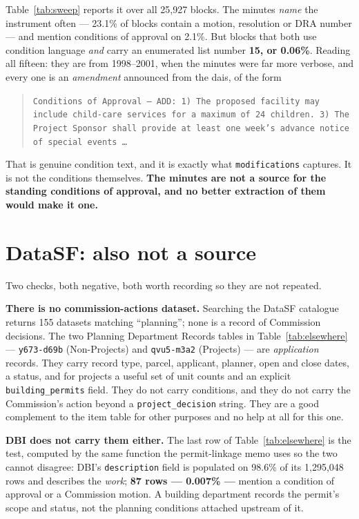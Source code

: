\documentclass[11pt]{article}
\begin{document}
Table~\ref{tab:sweep} reports it over all 25{,}927 blocks. The minutes \emph{name} the
instrument often --- 23.1\% of blocks contain a motion, resolution or DRA number --- and
mention conditions of approval on 2.1\%. But blocks that both use condition language
\emph{and} carry an enumerated list number \textbf{15, or 0.06\%}. Reading all fifteen: they
are from 1998--2001, when the minutes were far more verbose, and every one is an
\emph{amendment} announced from the dais, of the form

\begin{quote}\small
\texttt{Conditions of Approval — ADD: 1) The proposed facility may include child-care services
for a maximum of 24 children. 3) The Project Sponsor shall provide at least one week's advance
notice of special events \dots}
\end{quote}

That is genuine condition text, and it is exactly what \texttt{modifications} captures. It is
not the conditions themselves. \textbf{The minutes are not a source for the standing
conditions of approval, and no better extraction of them would make it one.}

\section{DataSF: also not a source}

Two checks, both negative, both worth recording so they are not repeated.

\textbf{There is no commission-actions dataset.} Searching the DataSF catalogue returns 155
datasets matching ``planning''; none is a record of Commission decisions. The two Planning
Department Records tables in Table~\ref{tab:elsewhere} --- \texttt{y673-d69b} (Non-Projects)
and \texttt{qvu5-m3a2} (Projects) --- are \emph{application} records. They carry
record type, parcel, applicant, planner, open and close dates, a status, and for projects a
useful set of unit counts and an explicit \texttt{building\_permits} field. They do not carry
conditions, and they do not carry the Commission's action beyond a
\texttt{project\_decision} string. They are a good complement to the item table for other
purposes and no help at all for this one.

\textbf{DBI does not carry them either.} The last row of Table~\ref{tab:elsewhere} is the
test, computed by the same function the permit-linkage memo uses so the two cannot disagree:
DBI's \texttt{description} field is populated on 98.6\% of its 1{,}295{,}048 rows and
describes the \emph{work}; \textbf{87 rows --- 0.007\% ---} mention a condition of approval or
a Commission motion. A building department records the permit's scope and status, not the planning
conditions attached upstream of it.
\end{document}
